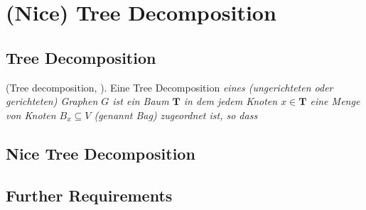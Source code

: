 %
%
%
\chapter{(Nice) Tree Decomposition}
\label{c:ntd} %

\section{Tree Decomposition}
\label{sec:ntd_td}
\begin{definition}
(Tree decomposition, \cite{robertson1984}). Eine Tree Decomposition \textit{eines (ungerichteten oder gerichteten) Graphen $G$ ist ein Baum $\mathbf{T}$ in dem jedem Knoten $x \in \mathbf{T}$ eine Menge von Knoten $B_x \subseteq V$ (genannt \glqq Bag\grqq) zugeordnet ist, so dass }
\end{definition}

\section{Nice Tree Decomposition}
\label{sec:ntd_ntd}

\section{Further Requirements}
\label{sec:ntd_req}
